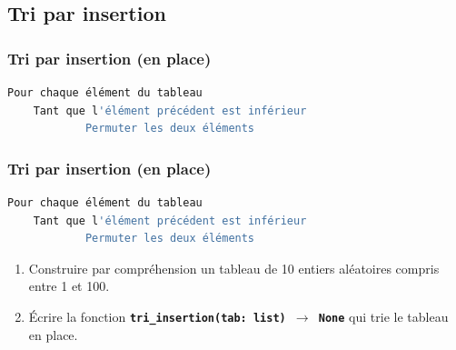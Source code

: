 \documentclass[svgnames,11pt]{beamer}
\begin{document}
\subsection{Tri par insertion}
\begin{frame}[fragile]
    \frametitle{Tri par insertion (en place)}

    \begin{center}
        \begin{lstlisting}[language=bash, basicstyle=\small, xrightmargin=1em]
Pour chaque élément du tableau
    Tant que l'élément précédent est inférieur
            Permuter les deux éléments
\end{lstlisting}
    \end{center}
    \begin{center}
    \end{center}
\end{frame}
\begin{frame}[fragile]
    \frametitle{Tri par insertion (en place)}

    \begin{center}
        \begin{lstlisting}[language=bash, basicstyle=\small, xrightmargin=1em]
Pour chaque élément du tableau
    Tant que l'élément précédent est inférieur
            Permuter les deux éléments
\end{lstlisting}
    \end{center}
    \begin{activite}
        \begin{enumerate}
            \item Construire par compréhension un tableau de 10 entiers aléatoires compris entre 1 et 100.
            \item Écrire la fonction \textbf{\texttt{tri\_insertion(tab: list) $\rightarrow$ None}} qui trie le tableau en place.
        \end{enumerate}
    \end{activite}
\end{frame}
\end{document}
